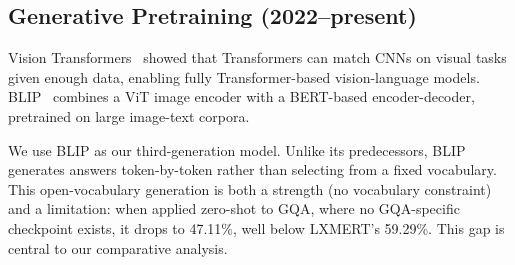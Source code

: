 \subsection{Generative Pretraining (2022--present)}

Vision Transformers~\cite{dosovitskiy2021vit} showed that Transformers can match CNNs on visual tasks given enough data, enabling fully Transformer-based vision-language models. BLIP~\cite{li2022blip} combines a ViT image encoder with a BERT-based encoder-decoder, pretrained on large image-text corpora.

We use BLIP as our third-generation model. Unlike its predecessors, BLIP generates answers token-by-token rather than selecting from a fixed vocabulary. This open-vocabulary generation is both a strength (no vocabulary constraint) and a limitation: when applied zero-shot to GQA, where no GQA-specific checkpoint exists, it drops to 47.11\%, well below LXMERT's 59.29\%. This gap is central to our comparative analysis.
